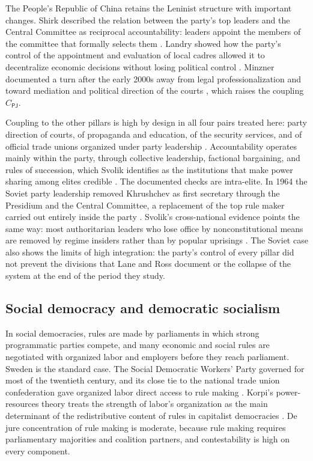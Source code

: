 \documentclass[11pt,letterpaper]{article}
\theoremstyle{definition}
\theoremstyle{remark}
\newcommand{\pP}{\mathsf{P}}
\newcommand{\pJ}{\mathsf{J}}
\begin{document}
The People's Republic of China retains the Leninist structure with important changes. Shirk described the relation between the party's top leaders and the Central Committee as reciprocal accountability: leaders appoint the members of the committee that formally selects them \citep{shirk1993}. Landry showed how the party's control of the appointment and evaluation of local cadres allowed it to decentralize economic decisions without losing political control \citep{landry2008}. Minzner documented a turn after the early 2000s away from legal professionalization and toward mediation and political direction of the courts \citep{minzner2011}, which raises the coupling $C_{\pP\pJ}$.

Coupling to the other pillars is high by design in all four pairs treated here: party direction of courts, of propaganda and education, of the security services, and of official trade unions organized under party leadership \citep{kornai1992}. Accountability operates mainly within the party, through collective leadership, factional bargaining, and rules of succession, which Svolik identifies as the institutions that make power sharing among elites credible \citep{svolik2012}. The documented checks are intra-elite. In 1964 the Soviet party leadership removed Khrushchev as first secretary through the Presidium and the Central Committee, a replacement of the top rule maker carried out entirely inside the party \citep{hough1979}. Svolik's cross-national evidence points the same way: most authoritarian leaders who lose office by nonconstitutional means are removed by regime insiders rather than by popular uprisings \citep{svolik2012}. The Soviet case also shows the limits of high integration: the party's control of every pillar did not prevent the divisions that Lane and Ross document or the collapse of the system at the end of the period they study.

\subsection{Social democracy and democratic socialism}

In social democracies, rules are made by parliaments in which strong programmatic parties compete, and many economic and social rules are negotiated with organized labor and employers before they reach parliament. Sweden is the standard case. The Social Democratic Workers' Party governed for most of the twentieth century, and its close tie to the national trade union confederation gave organized labor direct access to rule making \citep{esping1985}. Korpi's power-resources theory treats the strength of labor's organization as the main determinant of the redistributive content of rules in capitalist democracies \citep{korpi1983}. De jure concentration of rule making is moderate, because rule making requires parliamentary majorities and coalition partners, and contestability is high on every component.
\end{document}
